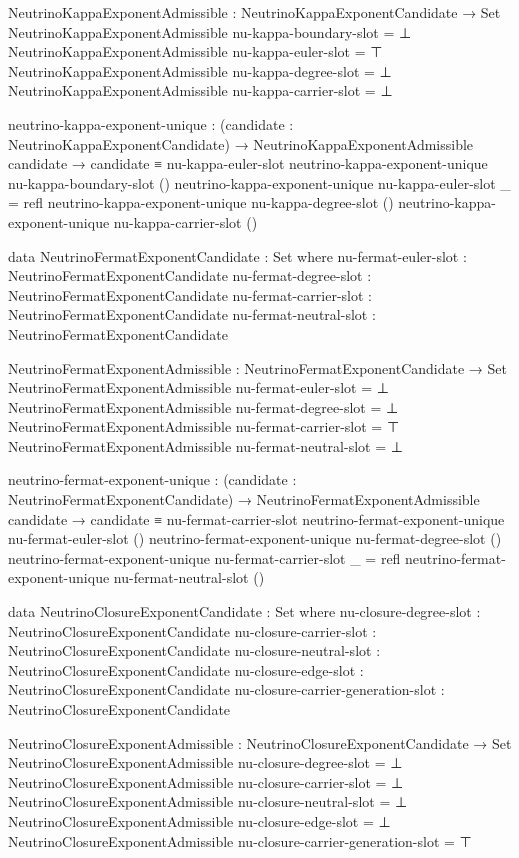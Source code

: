 \documentclass[11pt,a4paper]{book}
\begin{document}
\begin{code}
NeutrinoKappaExponentAdmissible : NeutrinoKappaExponentCandidate → Set
NeutrinoKappaExponentAdmissible nu-kappa-boundary-slot = ⊥
NeutrinoKappaExponentAdmissible nu-kappa-euler-slot    = ⊤
NeutrinoKappaExponentAdmissible nu-kappa-degree-slot   = ⊥
NeutrinoKappaExponentAdmissible nu-kappa-carrier-slot  = ⊥

neutrino-kappa-exponent-unique :
  (candidate : NeutrinoKappaExponentCandidate) →
  NeutrinoKappaExponentAdmissible candidate →
  candidate ≡ nu-kappa-euler-slot
neutrino-kappa-exponent-unique nu-kappa-boundary-slot ()
neutrino-kappa-exponent-unique nu-kappa-euler-slot _ = refl
neutrino-kappa-exponent-unique nu-kappa-degree-slot ()
neutrino-kappa-exponent-unique nu-kappa-carrier-slot ()

data NeutrinoFermatExponentCandidate : Set where
  nu-fermat-euler-slot   : NeutrinoFermatExponentCandidate
  nu-fermat-degree-slot  : NeutrinoFermatExponentCandidate
  nu-fermat-carrier-slot : NeutrinoFermatExponentCandidate
  nu-fermat-neutral-slot : NeutrinoFermatExponentCandidate

NeutrinoFermatExponentAdmissible : NeutrinoFermatExponentCandidate → Set
NeutrinoFermatExponentAdmissible nu-fermat-euler-slot   = ⊥
NeutrinoFermatExponentAdmissible nu-fermat-degree-slot  = ⊥
NeutrinoFermatExponentAdmissible nu-fermat-carrier-slot = ⊤
NeutrinoFermatExponentAdmissible nu-fermat-neutral-slot = ⊥

neutrino-fermat-exponent-unique :
  (candidate : NeutrinoFermatExponentCandidate) →
  NeutrinoFermatExponentAdmissible candidate →
  candidate ≡ nu-fermat-carrier-slot
neutrino-fermat-exponent-unique nu-fermat-euler-slot ()
neutrino-fermat-exponent-unique nu-fermat-degree-slot ()
neutrino-fermat-exponent-unique nu-fermat-carrier-slot _ = refl
neutrino-fermat-exponent-unique nu-fermat-neutral-slot ()

data NeutrinoClosureExponentCandidate : Set where
  nu-closure-degree-slot             : NeutrinoClosureExponentCandidate
  nu-closure-carrier-slot            : NeutrinoClosureExponentCandidate
  nu-closure-neutral-slot            : NeutrinoClosureExponentCandidate
  nu-closure-edge-slot               : NeutrinoClosureExponentCandidate
  nu-closure-carrier-generation-slot : NeutrinoClosureExponentCandidate

NeutrinoClosureExponentAdmissible : NeutrinoClosureExponentCandidate → Set
NeutrinoClosureExponentAdmissible nu-closure-degree-slot = ⊥
NeutrinoClosureExponentAdmissible nu-closure-carrier-slot = ⊥
NeutrinoClosureExponentAdmissible nu-closure-neutral-slot = ⊥
NeutrinoClosureExponentAdmissible nu-closure-edge-slot = ⊥
NeutrinoClosureExponentAdmissible nu-closure-carrier-generation-slot = ⊤


\end{code}
\end{document}
